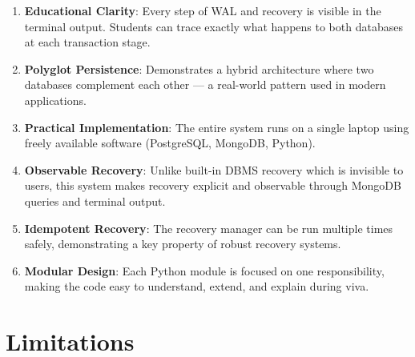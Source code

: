 \begin{enumerate}
  \item \textbf{Educational Clarity}: Every step of WAL and recovery is
        visible in the terminal output. Students can trace exactly what
        happens to both databases at each transaction stage.

  \item \textbf{Polyglot Persistence}: Demonstrates a hybrid architecture
        where two databases complement each other --- a real-world pattern
        used in modern applications.

  \item \textbf{Practical Implementation}: The entire system runs on a
        single laptop using freely available software (PostgreSQL, MongoDB,
        Python).

  \item \textbf{Observable Recovery}: Unlike built-in DBMS recovery which
        is invisible to users, this system makes recovery explicit and
        observable through MongoDB queries and terminal output.

  \item \textbf{Idempotent Recovery}: The recovery manager can be run
        multiple times safely, demonstrating a key property of robust
        recovery systems.

  \item \textbf{Modular Design}: Each Python module is focused on one
        responsibility, making the code easy to understand, extend, and
        explain during viva.
\end{enumerate}

\section{Limitations}

